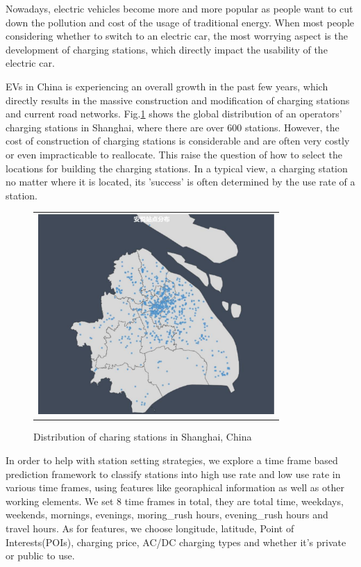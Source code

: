 \documentclass[conference]{IEEEtran}
\begin{document}
Nowadays, electric vehicles become more and more popular as people want to cut down the pollution and cost of the usage of traditional energy. When most people considering whether to switch to an electric car, the most worrying aspect is the development of charging stations, which directly impact the usability of the electric car.

EVs in China is experiencing an overall growth in the past few years, which directly results in the massive construction and modification of charging stations and current road networks. Fig.\ref{fig1} shows the global distribution of an operators' charging stations in Shanghai, where there are over 600 stations. However, the cost of construction of charging stations is considerable and are often very costly or even impracticable to reallocate. This raise the question of how to select the locations for building the charging stations. In a typical view, a charging station no matter where it is located, its 'success' is often determined by the use rate of a station.

\begin{figure}[htbp]
	\begin{tabular}{c}
		\includegraphics[width=90mm]{areas.pdf}
	\end{tabular}
	\centering
	\caption{Distribution of charing stations in Shanghai, China}
	\label{fig1}
\end{figure}  

In order to help with station setting strategies, we explore a time frame based prediction framework to classify stations into high use rate and low use rate in various time frames, using features like georaphical information as well as other working elements. We set 8 time frames in total, they are total time, weekdays, weekends, mornings, evenings, moring\_rush hours, evening\_rush hours and travel hours. As for features, we choose longitude, latitude, Point of Interests(POIs), charging price, AC/DC charging types and whether it's private or public to use.
\end{document}
